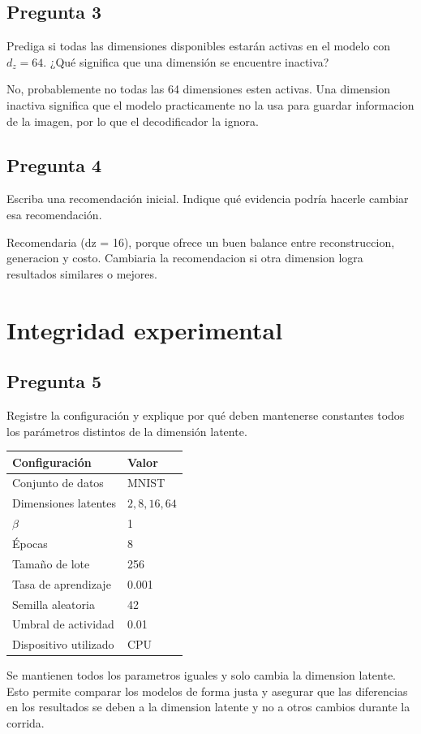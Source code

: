 \documentclass[11pt,letterpaper]{article}
\begin{document}
\subsection*{Pregunta 3}
Prediga si todas las dimensiones disponibles estarán activas en el modelo con
$d_z=64$. ¿Qué significa que una dimensión se encuentre inactiva?
\begin{responsebox}
No, probablemente no todas las 64 dimensiones esten activas. Una dimension inactiva significa que el modelo practicamente no la usa para guardar informacion de la imagen, por lo que el decodificador la ignora.
\end{responsebox}

\subsection*{Pregunta 4}
Escriba una recomendación inicial. Indique qué evidencia podría hacerle cambiar
esa recomendación.
\begin{responsebox}
Recomendaria (dz = 16), porque ofrece un buen balance entre reconstruccion, generacion y costo. Cambiaria la recomendacion si otra dimension logra resultados similares o mejores.
\end{responsebox}

\section{Integridad experimental}

\subsection*{Pregunta 5}
Registre la configuración y explique por qué deben mantenerse constantes todos
los parámetros distintos de la dimensión latente.

\begin{center}
\renewcommand{\arraystretch}{1.3}
\begin{tabular}{@{}ll@{}}
\toprule
Configuración & Valor \\
\midrule
Conjunto de datos & MNIST \\
Dimensiones latentes & $2,8,16,64$ \\
$\beta$ & 1 \\
Épocas & 8 \\
Tamaño de lote & 256 \\
Tasa de aprendizaje & 0.001 \\
Semilla aleatoria & 42 \\
Umbral de actividad & 0.01 \\
Dispositivo utilizado & CPU \\
\bottomrule
\end{tabular}
\end{center}
\begin{responsebox}
Se mantienen todos los parametros iguales y solo cambia la dimension latente. Esto permite comparar los modelos de forma justa y asegurar que las diferencias en los resultados se deben a la dimension latente y no a otros cambios durante la corrida.
\end{responsebox}
\end{document}
